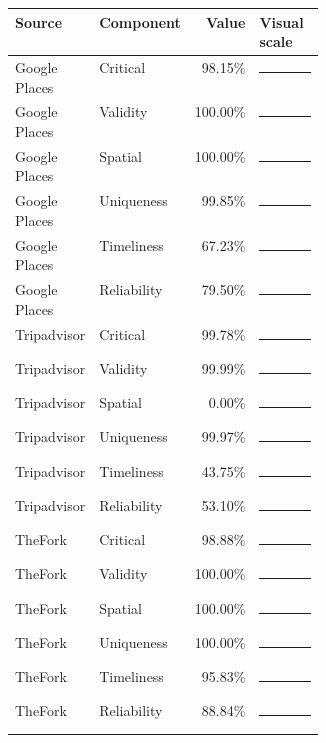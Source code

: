 {\scriptsize
\begin{tabular}{llrp{0.36\linewidth}}
\toprule
Source & Component & Value & Visual scale \\
\midrule
Google Places & Critical & 98.15\% & \textcolor{qualitygreen}{\rule{47.1mm}{5pt}} \\
Google Places & Validity & 100.00\% & \textcolor{qualitygreen}{\rule{48.0mm}{5pt}} \\
Google Places & Spatial & 100.00\% & \textcolor{qualitygreen}{\rule{48.0mm}{5pt}} \\
Google Places & Uniqueness & 99.85\% & \textcolor{qualitygreen}{\rule{47.9mm}{5pt}} \\
Google Places & Timeliness & 67.23\% & \textcolor{qualityorange}{\rule{32.3mm}{5pt}} \\
Google Places & Reliability & 79.50\% & \textcolor{qualityorange}{\rule{38.2mm}{5pt}} \\
Tripadvisor & Critical & 99.78\% & \textcolor{qualitygreen}{\rule{47.9mm}{5pt}} \\
Tripadvisor & Validity & 99.99\% & \textcolor{qualitygreen}{\rule{48.0mm}{5pt}} \\
Tripadvisor & Spatial & 0.00\% & \textcolor{qualityred}{\rule{0.6mm}{5pt}} \\
Tripadvisor & Uniqueness & 99.97\% & \textcolor{qualitygreen}{\rule{48.0mm}{5pt}} \\
Tripadvisor & Timeliness & 43.75\% & \textcolor{qualityred}{\rule{21.0mm}{5pt}} \\
Tripadvisor & Reliability & 53.10\% & \textcolor{qualityorange}{\rule{25.5mm}{5pt}} \\
TheFork & Critical & 98.88\% & \textcolor{qualitygreen}{\rule{47.5mm}{5pt}} \\
TheFork & Validity & 100.00\% & \textcolor{qualitygreen}{\rule{48.0mm}{5pt}} \\
TheFork & Spatial & 100.00\% & \textcolor{qualitygreen}{\rule{48.0mm}{5pt}} \\
TheFork & Uniqueness & 100.00\% & \textcolor{qualitygreen}{\rule{48.0mm}{5pt}} \\
TheFork & Timeliness & 95.83\% & \textcolor{qualitygreen}{\rule{46.0mm}{5pt}} \\
TheFork & Reliability & 88.84\% & \textcolor{qualityblue}{\rule{42.6mm}{5pt}} \\
\bottomrule
\end{tabular}
}

